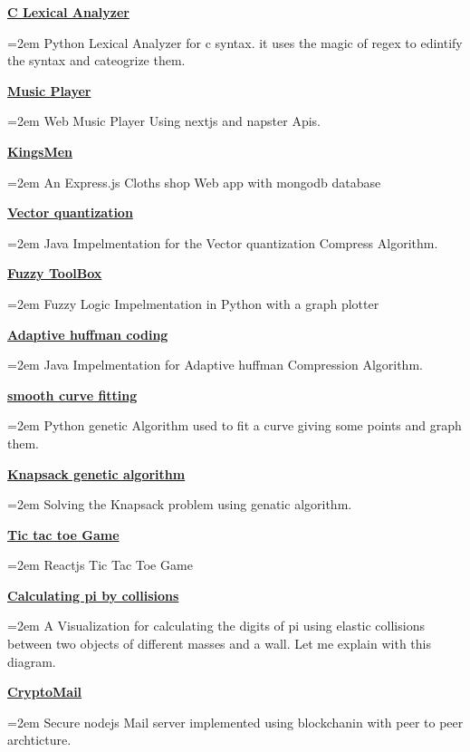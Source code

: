 \documentclass[paper=a4,fontsize=11pt]{scrartcl} %
\newcommand{\ProjectEntry}[2]{
		\noindent \textbf{#1} \hfill      %
		
		\noindent\hangindent=2em\hangafter=0 \small #2 %
		\normalsize \par}
\begin{document}
{\ProjectEntry{\href{https://github.com/peter44322/lexical-analyzer}{C Lexical Analyzer}}{
Python Lexical Analyzer for c syntax. it uses the magic of regex to edintify the syntax and cateogrize them.
}


\ProjectEntry{\href{https://github.com/peter44322/react-songs-app}{Music Player}}{
Web Music Player Using nextjs and napster Apis.
}

\ProjectEntry{\href{https://github.com/peter44322/KingsMen}{KingsMen}}{
An Express.js Cloths shop Web app with mongodb database
}

\ProjectEntry{\href{https://github.com/peter44322/vector-quantization}{Vector quantization}}{
Java Impelmentation for the Vector quantization Compress Algorithm.
}

\ProjectEntry{\href{https://github.com/peter44322/FuzzyToolBox}{Fuzzy ToolBox}}{
Fuzzy Logic Impelmentation in Python with a graph plotter
}

\ProjectEntry{\href{https://github.com/peter44322/adaptive-huffman-coding}{Adaptive huffman coding}}{
Java Impelmentation for Adaptive huffman Compression Algorithm.}

\ProjectEntry{\href{https://github.com/peter44322/smooth-curve-fitting-genetic-algorithm}{smooth curve fitting}}{
Python genetic Algorithm used to fit a curve giving some points and graph them.}

\ProjectEntry{\href{https://github.com/peter44322/Knapsack-genetic-algorithm}{Knapsack genetic algorithm}}{Solving the Knapsack problem using genatic algorithm.}


\ProjectEntry{\href{https://github.com/peter44322/reactjs-tic-tac-toe}{Tic tac toe Game}}{Reactjs Tic Tac Toe Game}



\ProjectEntry{\href{https://github.com/peter44322/calculating-pi-by-collision}{Calculating pi by collisions}}{A Visualization for calculating the digits of pi using elastic collisions between two objects of different masses and a wall. Let me explain with this diagram.}

\ProjectEntry{\href{https://github.com/peter44322/CryptoMail}{CryptoMail}}{Secure nodejs Mail server implemented using blockchanin with peer to peer archticture.}

}
\end{document}
